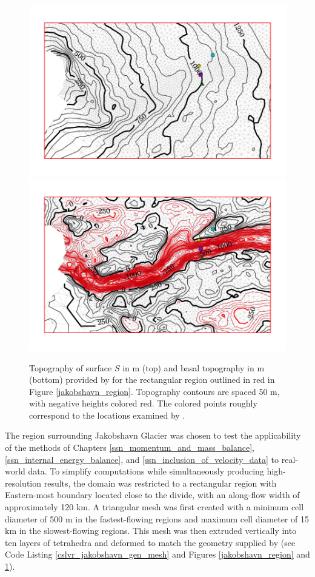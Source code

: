 \begin{figure}
  \centering
    \includegraphics[width=0.8\linewidth]{images/internal_energy/jakob_results/inversion_Wc_0.01/S.pdf}
    \includegraphics[width=0.8\linewidth]{images/internal_energy/jakob_results/inversion_Wc_0.01/B.pdf}
  \caption[Jakobshavn Glacier topography]{Topography of surface $S$ in m (top) and basal topography in m (bottom) provided by \citet{bamber_2013} for the rectangular region outlined in {\color{red}red} in Figure \ref{jakobshavn_region}.  Topography contours are spaced 50 m, with negative heights colored {\color{red}red}.  The colored points roughly correspond to the locations examined by \citet{luethi_2002}.}
  \label{jakobshavn_topography}
\end{figure}


The region surrounding Jakobshavn Glacier was chosen to test the applicability of the methods of Chapters \ref{ssn_momentum_and_mass_balance}, \ref{ssn_internal_energy_balance}, and \ref{ssn_inclusion_of_velocity_data} to real-world data.  To simplify computations while simultaneously producing high-resolution results, the domain was restricted to a rectangular region with Eastern-most boundary located close to the divide, with an along-flow width of approximately 120 km.  A triangular mesh was first created with a minimum cell diameter of 500 m in the fastest-flowing regions and maximum cell diameter of 15 km in the slowest-flowing regions.  This mesh was then extruded vertically into ten layers of tetrahedra and deformed to match the geometry supplied by \citet{bamber_2013} (see Code Listing \ref{cslvr_jakobshavn_gen_mesh} and Figures \ref{jakobshavn_region} and \ref{jakobshavn_topography}).


